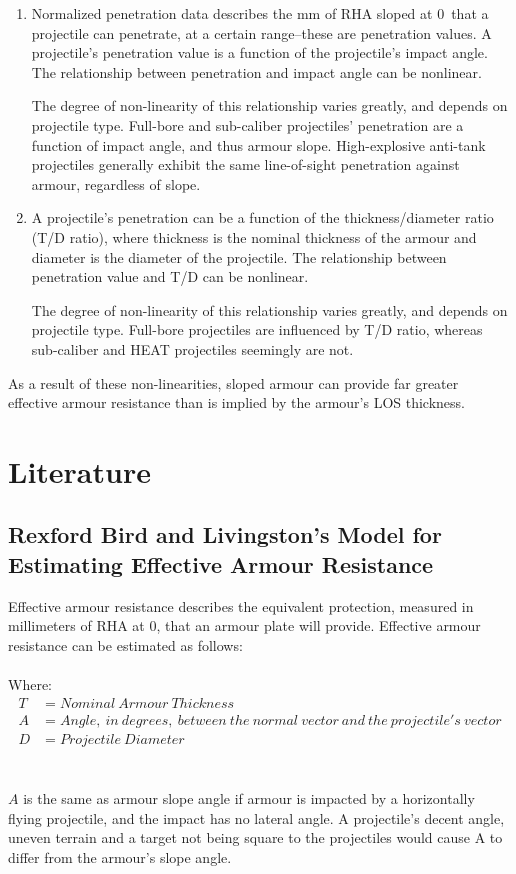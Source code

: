 \documentclass[]{article}
\begin{document}
\begin{enumerate}
	\item Normalized penetration data describes the mm of RHA sloped at 0\degree\ that a projectile can penetrate, at a certain range--these are penetration values. A projectile’s penetration value is a function of the projectile’s impact angle. The relationship between penetration and impact angle can be nonlinear.
	
	The degree of non-linearity of this relationship varies greatly, and depends on projectile type. Full-bore and sub-caliber projectiles’ penetration are a function of impact angle, and thus armour slope. High-explosive anti-tank projectiles generally exhibit the same line-of-sight penetration against armour, regardless of slope. 
	
	\item A projectile’s penetration can be a function of the thickness/diameter ratio (T/D ratio), where thickness is the nominal thickness of the armour and diameter is the diameter of the projectile. The relationship between penetration value and T/D can be nonlinear.
	
	The degree of non-linearity of this relationship varies greatly, and depends on projectile type. Full-bore projectiles are influenced by T/D ratio, whereas sub-caliber and HEAT projectiles seemingly are not.
\end{enumerate}

\noindent As a result of these non-linearities, sloped armour can provide far greater effective armour resistance than is implied by the armour’s LOS thickness.

\section{Literature}

\subsection{Rexford Bird and Livingston's Model for Estimating Effective Armour Resistance}
Effective armour resistance describes the equivalent protection, measured in millimeters of RHA at 0\degree, that an armour plate will provide. Effective armour resistance can be estimated as follows:
\\\\
Where:
\begin{align*}
T &= Nominal\:Armour\:Thickness\\
A &= Angle,\:in\:degrees,\:between\:the\:normal\:vector\:and\:the\:projectile's\:vector\\
D &= Projectile\:Diameter
\end{align*}
\\\\
\noindent $A$ is the same as armour slope angle if armour is impacted by a horizontally flying projectile, and the impact has no lateral angle. A projectile's decent angle, uneven terrain and a target not being square to the projectiles would cause A to differ from the armour's slope angle. \\
\end{document}
